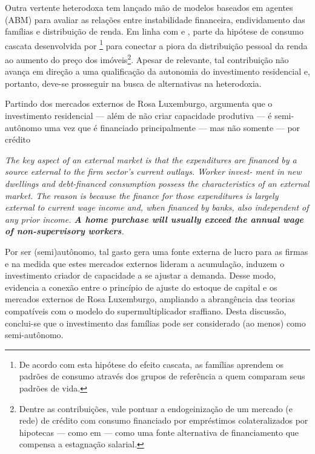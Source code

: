 Outra vertente heterodoxa tem lançado mão de modelos baseados em agentes (ABM) para avaliar as relações entre instabilidade financeira, endividamento das famílias e distribuição de renda.
Em linha com \textcite{cynamon_inequality_2013} e \textcite{erlingsson_integrating_2013}, \textcite{cardaci_inequality_2018} parte da hipótese de consumo cascata desenvolvida por \textcite{frank_expenditure_2014}\footnote{
	De acordo com esta hipótese do efeito cascata, as famílias aprendem os padrões de consumo através dos grupos de referência a quem comparam seus padrões de vida.
} para conectar a piora da distribuição pessoal da renda ao aumento do preço dos imóveis\footnote{Dentre as contribuições, vale pontuar a endogeinização de um mercado (e rede) de crédito com consumo financiado por empréstimos colateralizados por hipotecas --- como em \textcite{mian_house_2011} --- como uma fonte alternativa de financiamento que compensa a estagnação salarial.}.
Apesar de relevante, tal contribuição não avança em direção a uma qualificação da autonomia do investimento residencial e, portanto, deve-se prosseguir na busca de alternativas na heterodoxia.

Partindo dos mercados externos de Rosa Luxemburgo, \textcite{fiebiger_semi-autonomous_2018} argumenta que o investimento residencial --- além de não criar capacidade produtiva --- é semi-autônomo uma vez que é financiado principalmente --- mas não somente --- por crédito

\begin{citacao}
	\textit{The key aspect of an external market is that the expenditures
		are financed by a source external to the firm sector’s current outlays. Worker invest-
		ment in new dwellings and debt-financed consumption possess the characteristics of
		an external market. The reason is because the finance for those expenditures is largely
		external to current wage income and, when financed by banks, also independent of any
		prior income. \textbf{A home purchase will usually exceed the annual wage of non-supervisory
			workers}.
	}
	\cite[p.~3, grifos adicionados]{fiebiger_semi-autonomous_2018}
\end{citacao}
Por ser (semi)autônomo, tal gasto gera uma fonte externa de lucro para as firmas e na medida que estes mercados externos lideram a acumulação, induzem o investimento criador de capacidade a se ajustar a demanda.
Desse modo, \textcite{fiebiger_semi-autonomous_2018} evidencia a conexão entre o princípio de ajuste do estoque de capital e os mercados externos de Rosa Luxemburgo, ampliando a abrangência das teorias compatíveis com o modelo do supermultiplicador sraffiano.
Desta discussão, conclui-se que o investimento das famílias pode ser considerado (ao menos) como semi-autônomo. 

